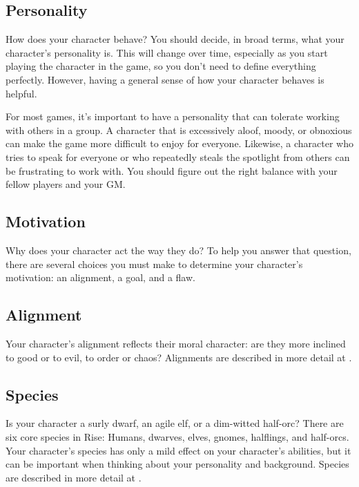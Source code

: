     \subsection{Personality}

        How does your character behave?
        You should decide, in broad terms, what your character's personality is.
        This will change over time, especially as you start playing the character in the game, so you don't need to define everything perfectly.
        However, having a general sense of how your character behaves is helpful.

        For most games, it's important to have a personality that can tolerate working with others in a group.
        A character that is excessively aloof, moody, or obnoxious can make the game more difficult to enjoy for everyone.
        Likewise, a character who tries to speak for everyone or who repeatedly steals the spotlight from others can be frustrating to work with.
        You should figure out the right balance with your fellow players and your GM.\@

    \subsection{Motivation}

        Why does your character act the way they do?
        To help you answer that question, there are several choices you must make to determine your character's motivation: an alignment, a goal, and a flaw.

    \subsection{Alignment}

        Your character's alignment reflects their moral character: are they more inclined to good or to evil, to order or chaos?
        Alignments are described in more detail at .

    \subsection{Species}
        Is your character a surly dwarf, an agile elf, or a dim-witted half-orc?
        There are six core species in Rise: Humans, dwarves, elves, gnomes, halflings, and half-orcs.
        Your character's species has only a mild effect on your character's abilities, but it can be important when thinking about your personality and background.
        Species are described in more detail at .

